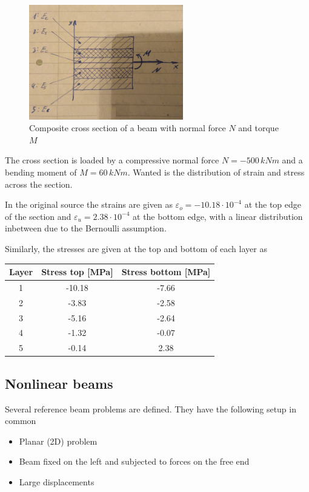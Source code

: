 \begin{figure}[H]
\centering
\includegraphics[width=0.6\textwidth]{figures/verification/composite-section}
\caption{Composite cross section of a beam with normal force $N$ and torque $M$}
\label{fig:verification:composite-section}
\end{figure}

The cross section is loaded by a compressive normal force $N = -500\,\unit{kNm}$ and a bending moment of $M = 60\,\unit{kNm}$.
Wanted is the distribution of strain and stress across the section.

In the original source the strains are given as $\varepsilon_{o} = -10.18 \cdot 10^{-4}$ at the top edge of the section and $\varepsilon_{u} = 2.38 \cdot 10^{-4}$ at the bottom edge, with a linear distribution inbetween due to the Bernoulli assumption.

Similarly, the stresses are given at the top and bottom of each layer as

\begin{tabular}{|c|c|c|}
\hline
Layer & Stress top [MPa] & Stress bottom [MPa] \\
\hline
1 & -10.18 & -7.66 \\
2 & -3.83 & -2.58 \\
3 & -5.16 & -2.64 \\
4 & -1.32 & -0.07 \\
5 & -0.14 & 2.38 \\
\hline
\end{tabular}

\newpage
\subsection*{Nonlinear beams}

Several reference beam problems are defined.
They have the following setup in common

\begin{itemize}
\item Planar (2D) problem
\item Beam fixed on the left and subjected to forces on the free end
\item Large displacements
\end{itemize}

